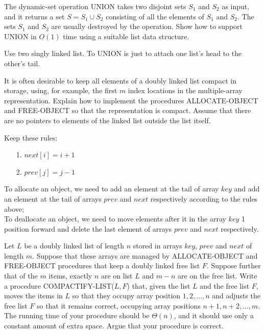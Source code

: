 \documentclass[12pt, a4paper, UTF8]{ctexart}
\begin{document}
\begin{problem}[TC: 10.2-6]
  The dynamic-set operation UNION takes two disjoint sets $S_{1}$ and $S_{2}$ 
  as input, and it returns a set $S = S_{1} \cup S_{2}$ consisting of all the 
  elements of $S_{1}$ and $S_{2}$. The sets $S_{1}$ and $S_{2}$ are usually 
  destroyed by the operation. Show how to support UNION in $O(1)$ time using 
  a suitable list data structure.
\end{problem}

\begin{solution}
  Use two singly linked list. To UNION is just to attach one list's head to 
  the other's tail.
\end{solution}

\begin{problem}[TC: 10.3-4]
  It is often desirable to keep all elements of a doubly linked list compact in 
  storage, using, for example, the first $m$ index locations in the multiple-array 
  representation. Explain how to implement the procedures ALLOCATE-OBJECT and 
  FREE-OBJECT so that the representation is compact. Assume that there are no 
  pointers to elements of the linked list outside the list itself.
\end{problem}

\begin{solution}
  Keep these rules:
  \begin{itemize}
    \item [1.] $next[i] = i + 1$
    \item [2.] $prev[j] = j - 1$
  \end{itemize}
  To allocate an object, we need to add an element at the tail of array $key$ 
  and add an element at the tail of arrays $prev$ and $next$ respectively 
  according to the rules above;\\
  To deallocate an object, we need to move elements after it in the array $key$ 
  1 position forward and delete the last element of arrays $prev$ and $next$ 
  respectively.
\end{solution}

\begin{problem}[TC: 10.3-5]
  Let $L$ be a doubly linked list of length $n$ stored in arrays $key$, $prev$ and 
  $next$ of length $m$. Suppose that these arrays are managed by ALLOCATE-OBJECT 
  and FREE-OBJECT procedures that keep a doubly linked free list $F$. Suppose 
  further that of the $m$ items, exactly $n$ are on list $L$ and $m-n$ are on the 
  free list. Write a procedure COMPACTIFY-LIST($L,F$) that, given the list $L$ and 
  the free list $F$, moves the items in $L$ so that they occupy array position 
  $1,2,\ldots,n$ and adjusts the free list $F$ so that it remains correct, occupying 
  array positions $n+1,n+2,\ldots,m$. The running time of your procedure should be 
  $\Theta(n)$, and it should use only a constant amount of extra space. Argue that 
  your procedure is correct.
\end{problem}
\end{document}
